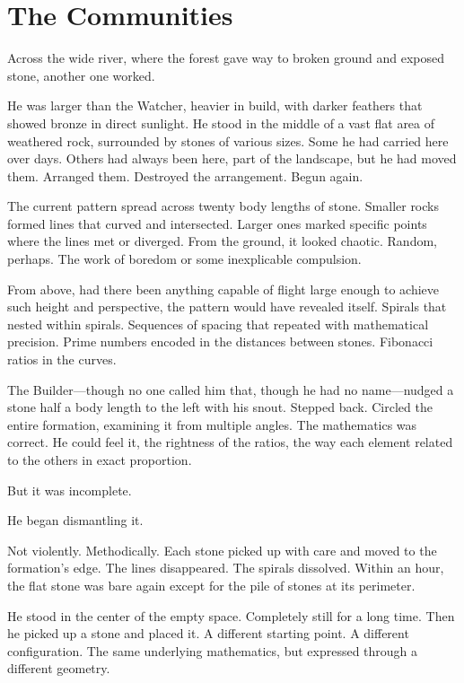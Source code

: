 \chapter{The Communities}
\label{ch:02}


Across the wide river, where the forest gave way to broken ground and exposed stone, another one worked.

He was larger than the Watcher, heavier in build, with darker feathers that showed bronze in direct sunlight. He stood in the middle of a vast flat area of weathered rock, surrounded by stones of various sizes. Some he had carried here over days. Others had always been here, part of the landscape, but he had moved them. Arranged them. Destroyed the arrangement. Begun again.

The current pattern spread across twenty body lengths of stone. Smaller rocks formed lines that curved and intersected. Larger ones marked specific points where the lines met or diverged. From the ground, it looked chaotic. Random, perhaps. The work of boredom or some inexplicable compulsion.

From above, had there been anything capable of flight large enough to achieve such height and perspective, the pattern would have revealed itself. Spirals that nested within spirals. Sequences of spacing that repeated with mathematical precision. Prime numbers encoded in the distances between stones. Fibonacci ratios in the curves.

The Builder—though no one called him that, though he had no name—nudged a stone half a body length to the left with his snout. Stepped back. Circled the entire formation, examining it from multiple angles. The mathematics was correct. He could feel it, the rightness of the ratios, the way each element related to the others in exact proportion.

But it was incomplete.

He began dismantling it.

Not violently. Methodically. Each stone picked up with care and moved to the formation's edge. The lines disappeared. The spirals dissolved. Within an hour, the flat stone was bare again except for the pile of stones at its perimeter.

He stood in the center of the empty space. Completely still for a long time. Then he picked up a stone and placed it. A different starting point. A different configuration. The same underlying mathematics, but expressed through a different geometry.

